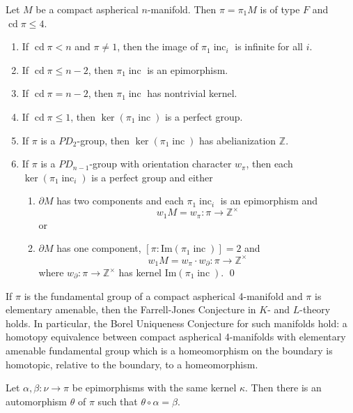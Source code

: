 \documentclass[10pt,a4paper]{amsart}
\DeclareMathOperator{\cd}{cd}
\DeclareMathOperator{\inc}{inc}
\newcommand{\Z}{\mathbb Z}
\renewcommand{\leq}{\leqslant}
\begin{document}
\begin{theorem}
\label{cd<n}
Let $M$ be a compact aspherical $n$-manifold.
Then $\pi=\pi_1M$ is of type $F$ and $\cd\pi\leq4$.
\begin{enumerate}
\item If $\cd \pi < n$ and $\pi \not = 1$, then the image of $\pi_1\inc_i$ is infinite for all $i$.
\item If $\cd \pi \leq{n-2}$, then $\pi_1\inc$ is an epimorphism.
\item If $\cd \pi =n- 2$, then $\pi_1\inc$ has nontrivial kernel.
\item If $\cd \pi \leq1$, then  $\ker(\pi_1\inc)$ is a perfect group. 
\item If $\pi$ is a $PD_2$-group, then $\ker(\pi_1\inc)$ 
has abelianization  $\Z$.
\item If $\pi$ is a $PD_{n-1}$-group with orientation character $w_{\pi}$,
then each $\ker(\pi_1\inc_i)$ is a perfect group and either
\begin{enumerate}
\item $\partial M$ has two components and each $\pi_1\inc_i$ is an epimorphism and
$$
w_1M = w_\pi : \pi \to \Z^{\times}
$$ 
or
\item $\partial M$ has one component, 
$[\pi:\mathrm{Im}(\pi_1\inc)]=2$ and
$$
w_1M = w_{\pi} \cdot w_{\partial} : \pi \to \Z^{\times}
$$
where $w_\partial: \pi \to \Z^{\times}$ has kernel $\mathrm{Im}(\pi_1\inc)$.
\qed
\end{enumerate}
\end{enumerate}
\end{theorem}

\begin{corollary} \label{FJC for EA in dim 4}
If $\pi$ is the fundamental group of a compact aspherical 4-manifold and $\pi$ is elementary amenable, then the Farrell-Jones Conjecture in $K$- and $L$-theory holds.  In particular, the Borel Uniqueness Conjecture for such manifolds hold: a homotopy equivalence between compact aspherical 4-manifolds with elementary amenable fundamental group which is a homeomorphism on the boundary is homotopic, relative to the boundary, to a homeomorphism.
\end{corollary}

\begin{lemma}
\label{epiaut}
Let $\alpha,\beta:\nu\to\pi$ be epimorphisms with the same kernel $\kappa$.
Then there is an automorphism $\theta$ of $\pi$ such that $\theta\circ\alpha=\beta$.
\end{lemma}
\end{document}
